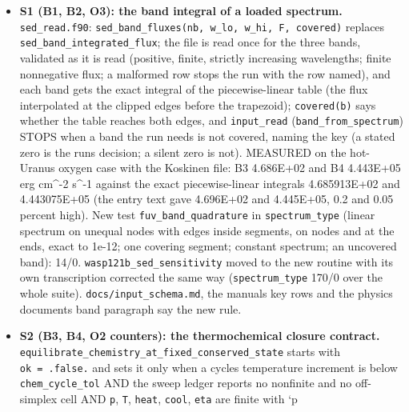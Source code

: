 \documentclass[english,a4paper]{my_memo}
\providecommand{\tightlist}{\setlength{\itemsep}{0pt}\setlength{\parskip}{0pt}}
\begin{document}
\begin{itemize}
\tightlist
\item
  \textbf{S1 (B1, B2, O3): the band integral of a loaded spectrum.}
  \texttt{sed\_read.f90}: \texttt{sed\_band\_fluxes(nb,\ w\_lo,\ w\_hi,\ F,\ covered)} replaces
  \texttt{sed\_band\_integrated\_flux}; the file is read once for the three bands,
  validated as it is read (positive, finite, strictly increasing
  wavelengths; finite nonnegative flux; a malformed row stops the run with
  the row named), and each band gets the exact integral of the
  piecewise-linear table (the flux interpolated at the clipped edges before
  the trapezoid); \texttt{covered(b)} says whether the table reaches both edges,
  and \texttt{input\_read} (\texttt{band\_from\_spectrum}) STOPS when a band the run needs is
  not covered, naming the key (a stated zero is the run\textquotesingle s decision; a
  silent zero is not). MEASURED on the hot-Uranus oxygen case with the
  Koskinen file: B3 4.686E+02 and B4 4.443E+05 erg cm\^{}-2 s\^{}-1 against the
  exact piecewise-linear integrals 4.685913E+02 and 4.443075E+05 (the
  entry text gave 4.696E+02 and 4.445E+05, 0.2 and 0.05 percent high). New
  test \texttt{fuv\_band\_quadrature} in \texttt{spectrum\_type} (linear spectrum on unequal
  nodes with edges inside segments, on nodes and at the ends, exact to
  1e-12; one covering segment; constant spectrum; an uncovered band): 14/0.
  \texttt{wasp121b\_sed\_sensitivity} moved to the new routine with its own
  transcription corrected the same way (\texttt{spectrum\_type} 170/0 over the
  whole suite). \texttt{docs/input\_schema.md}, the manual\textquotesingle s key rows and the
  physics document\textquotesingle s band paragraph say the new rule.
\item
  \textbf{S2 (B3, B4, O2 counters): the thermochemical closure contract.}
  \texttt{equilibrate\_chemistry\_at\_fixed\_conserved\_state} starts with \texttt{ok\ =\ .false.} and sets it only when a cycle\textquotesingle s temperature increment is below
  \texttt{chem\_cycle\_tol} AND the sweep ledger reports no nonfinite and no
  off-simplex cell AND \texttt{p}, \texttt{T}, \texttt{heat}, \texttt{cool}, \texttt{eta} are finite with `p


\end{itemize}
\end{document}
